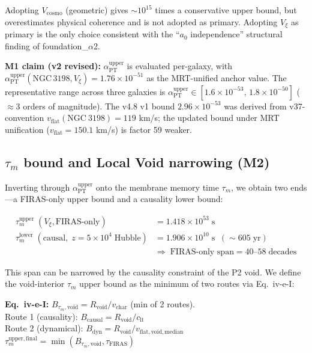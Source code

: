 \documentclass[11pt,a4paper]{article}
\newcommand{\Vxi}{V_{\xi}}
\newcommand{\aPT}{\alpha_{\mathrm{PT}}}
\newcommand{\taum}{\tau_{m}}
\newcommand{\vflat}{v_{\mathrm{flat}}}
\newcommand{\clt}{c_{\mathrm{lt}}}
\newcommand{\Rvoid}{R_{\mathrm{void}}}
\newcommand{\vchar}{v_{\mathrm{char}}}
\begin{document}
\medskip\noindent
Adopting $V_{\mathrm{cosmo}}$ (geometric) gives $\sim 10^{15}$ times a conservative upper bound,
but overestimates physical coherence and is not adopted as primary. Adopting $\Vxi$ as primary
is the only choice consistent with the ``$a_0$ independence'' structural finding of
foundation\_$\alpha$2.

\begin{keybox}
\textbf{M1 claim (v2 revised):} $\aPT^{\mathrm{upper}}$ is evaluated per-galaxy, with
$\aPT^{\mathrm{upper}}(\mathrm{NGC\,3198}, \Vxi) = 1.76 \times 10^{-51}$ as the MRT-unified
anchor value. The representative range across three galaxies is
$\aPT^{\mathrm{upper}} \in [1.6\times10^{-53},\, 1.8\times10^{-50}]$ ($\approx$3 orders of magnitude).
The v4.8 v1 bound $2.96 \times 10^{-53}$ was derived from v37-convention
$\vflat(\mathrm{NGC~3198}) = 119$ km/s; the updated bound under MRT unification
($\vflat = 150.1$ km/s) is factor 59 weaker.
\end{keybox}

\subsection{$\taum$ bound and Local Void narrowing (M2)}
Inverting through $\aPT^{\mathrm{upper}}$ onto the membrane memory time $\taum$, we obtain two ends
---a FIRAS-only upper bound and a causality lower bound:

\begin{align*}
\taum^{\mathrm{upper}}\;(\Vxi, \mathrm{FIRAS\text{-}only}) &= 1.418 \times 10^{53}\;\mathrm{s} \\
\taum^{\mathrm{lower}}\;(\mathrm{causal},\;z = 5 \times 10^{4}\;\mathrm{Hubble}) &= 1.906 \times 10^{10}\;\mathrm{s}\;\;(\sim 605\;\mathrm{yr}) \\
&\Rightarrow\;\text{FIRAS-only span} = 40\text{--}58\;\text{decades}
\end{align*}

This span can be narrowed by the causality constraint of the P2 void. We define the void-interior
$\taum$ upper bound as the minimum of two routes via Eq.~iv-e-I:

\begin{keybox}
\textbf{Eq.~iv-e-I:} $B_{\taum,\mathrm{void}} = \Rvoid / \vchar$ (min of 2 routes).\\[2pt]
\quad Route 1 (causality): $B_{\mathrm{causal}} = \Rvoid / \clt$\\
\quad Route 2 (dynamical): $B_{\mathrm{dyn}} = \Rvoid / v_{\mathrm{flat,void,median}}$\\[2pt]
\quad $\taum^{\mathrm{upper,final}} = \min(B_{\taum,\mathrm{void}}, \tau_{\mathrm{FIRAS}})$
\end{keybox}
\end{document}
